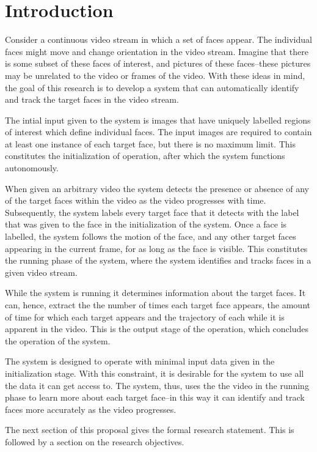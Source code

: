 \section{Introduction}
  Consider a continuous video stream in which a set of faces appear.
  The individual faces might move and change orientation in the video stream.
  Imagine that there is some subset of these faces of interest, and pictures of these faces--these pictures may be unrelated to the video or frames of the video.
  With these ideas in mind, the goal of this research is to develop a system that can automatically identify and track the target faces in the video stream.

  The intial input given to the system is images that have uniquely labelled regions of interest which define individual faces.
  The input images are required to contain at least one instance of each target face, but there is no maximum limit.
  This constitutes the initialization of operation, after which the system functions autonomously.

  When given an arbitrary video the system detects the presence or absence of any of the target faces within the video as the video progresses with time.
  Subsequently, the system labels every target face that it detects with the label that was given to the face in the initialization of the system.
  Once a face is labelled, the system follows the motion of the face, and any other target faces appearing in the current frame, for as long as the face is visible.
  This constitutes the running phase of the system, where the system identifies and tracks faces in a given video stream.

  While the system is running it determines information about the target faces.
  It can, hence, extract the the number of times each target face appears, the amount of time for which each target appears and the trajectory of each while it is apparent in the video.
  This is the output stage of the operation, which concludes the operation of the system.

  The system is designed to operate with minimal input data given in the initialization stage.
  With this constraint, it is desirable for the system to use all the data it can get access to. 
  The system, thus, uses the the video in the running phase to learn more about each target face--in this way it can identify and track faces more accurately as the video progresses.

  The next section of this proposal gives the formal research statement.
  This is followed by a section on the research objectives.

